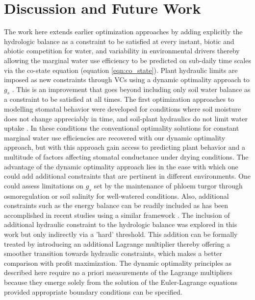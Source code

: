 \documentclass[utf8]{frontiersSCNS} %
\begin{document}
\section{Discussion and Future Work}

The work here extends earlier optimization approaches by adding explicitly the hydrologic balance as a constraint to be satisfied at every instant, biotic and abiotic competition for water, and variability in environmental drivers thereby allowing the marginal water use efficiency to be predicted on sub-daily time scales via the co-state equation (equation \ref{eqn:co_state}).  Plant hydraulic limits are imposed as new constraints through VCs using a dynamic optimality approach to $g_s$ \citep{manzoni_optimization_2013}. This is an improvement that goes beyond including only soil water balance as a constraint to be satisfied at all times.
The first optimization approaches to modelling stomatal behavior were developed for conditions where soil moisture does not change appreciably in time, and soil-plant hydraulics do not limit water uptake \citep{cowan_stomatal_1977, cowan_stomatal_1978}. In these conditions the conventional optimality solutions for constant marginal water use efficiencies  \citep{katul_stomatal_2009} are recovered with our dynamic optimality approach, but with this approach gain access to predicting plant behavior and a multitude of factors affecting stomatal conductance under drying conditions. The advantage of the dynamic optimality approach lies in the ease with which one could add additional constraints that are pertinent in different environments. One could assess limitations on $g_s$ set by the maintenance of phloem turgor through osmoregulation \citep{sevanto_how_2014} or soil salinity for well-watered conditions. Also, additional constraints such as the energy balance can be readily included as has been accomplished in recent studies using a similar framework \citep{roth2018fossil}.  The inclusion of additional hydraulic constraint to the hydrologic balance was explored in this work but only indirectly via a 'hard' threshold. This addition can be formally treated by introducing an additional Lagrange multiplier thereby offering a smoother transition towards hydraulic constraints, which makes a better comparison with profit maximization. The dynamic optimality principles as described here require no a priori measurements of the Lagrange multipliers because they emerge solely from the solution of the Euler-Lagrange equations \citep{witelski_variational_2015} provided appropriate boundary conditions can be specified.
\end{document}
